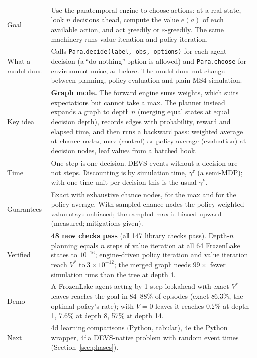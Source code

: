 \documentclass[11pt]{article}
\newcommand{\code}[1]{\texttt{#1}}
\theoremstyle{plain}
\begin{document}
\begin{tabularx}{\linewidth}{@{}>{\bfseries\raggedright\arraybackslash}p{3.3cm}Y@{}}
\toprule
Goal & Use the paratemporal engine to choose actions: at a real state, look $n$ decisions ahead, compute the value
  $e(a)$ of each available action, and act greedily or $\varepsilon$-greedily. The same machinery runs value iteration
  and policy iteration.\\
What a model does & Calls \code{Para.decide(label, obs, options)} for each agent decision (a ``do nothing'' option is
  allowed) and \code{Para.choose} for environment noise, as before. The model does not change between planning,
  policy evaluation and plain MS4 simulation.\\
Key idea & \textbf{Graph mode.} The forward engine sums weights, which suits expectations but cannot take a max.
  The planner instead expands a graph to depth $n$ (merging equal states at equal decision depth), records edges
  with probability, reward and elapsed time, and then runs a backward pass: weighted average at chance nodes, max
  (control) or policy average (evaluation) at decision nodes, leaf values from a batched hook.\\
Time & One step is one decision. DEVS events without a decision are not steps. Discounting is by simulation time,
  $\gamma^{\tau}$ (a semi-MDP); with one time unit per decision this is the usual $\gamma^k$.\\
Guarantees & Exact with exhaustive chance nodes, for the max and for the policy average. With sampled chance nodes
  the policy-weighted value stays unbiased; the sampled max is biased upward (measured; mitigations given).\\
Verified & \textbf{48 new checks pass} (all 147 library checks pass). Depth-$n$ planning equals $n$ steps of value
  iteration at all 64 FrozenLake states to $10^{-16}$; engine-driven policy iteration and value iteration reach $V^*$
  to $3\times10^{-12}$; the merged graph needs $99\times$ fewer simulation runs than the tree at depth 4.\\
Demo & A FrozenLake agent acting by 1-step lookahead with exact $V^*$ leaves reaches the goal in 84--88\% of
  episodes (exact 86.3\%, the optimal policy's rate); with $V=0$ leaves it reaches 0.2\% at depth 1, 7.6\% at depth 8,
  57\% at depth 14.\\
Next & 4d learning comparisons (Python, tabular), 4e the Python wrapper, 4f a DEVS-native problem with random
  event times (Section~\ref{sec:phases}).\\
\bottomrule
\end{tabularx}
\end{document}
